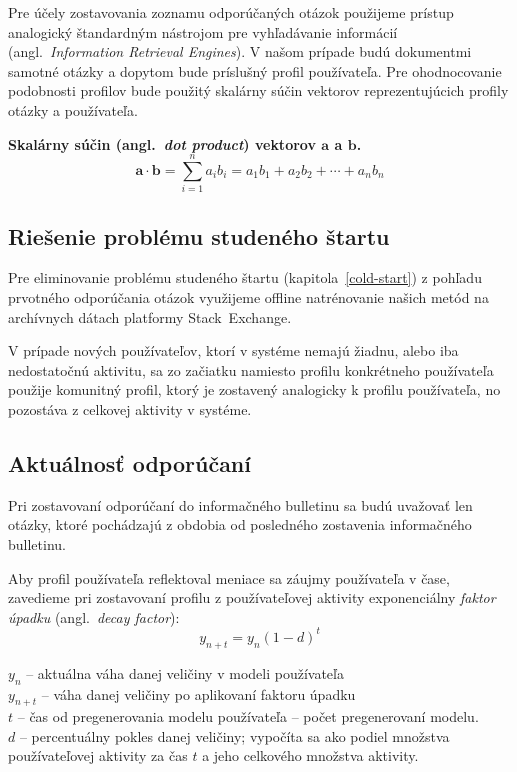 Pre účely zostavovania zoznamu odporúčaných otázok použijeme prístup analogický štandardným nástrojom pre vyhľadávanie
informácií (angl.~\emph{Information Retrieval Engines}). V našom prípade budú dokumentmi samotné otázky a dopytom bude
príslušný profil používateľa. Pre ohodnocovanie podobnosti profilov bude použitý skalárny súčin vektorov reprezentujúcich
profily otázky a používateľa.

\textbf{Skalárny súčin (angl.~\textit{dot product}) vektorov $\mathbf{a}$ a $\mathbf{b}$.}\\
$$\mathbf{a}\cdot\mathbf{b}=\sum_{i=1}^n a_ib_i=a_1b_1+a_2b_2+\cdots+a_nb_n$$

\subsection{Riešenie problému studeného štartu}

Pre eliminovanie problému studeného štartu (kapitola~\ref{cold-start}) z pohľadu prvotného odporúčania otázok využijeme
offline natrénovanie našich metód na archívnych dátach platformy Stack~Exchange.

V prípade nových používateľov, ktorí v systéme nemajú žiadnu, alebo iba nedostatočnú aktivitu, sa zo začiatku namiesto profilu
konkrétneho používateľa použije komunitný profil, ktorý je zostavený analogicky k profilu používateľa, no pozostáva
z celkovej aktivity v systéme.


\subsection{Aktuálnosť odporúčaní}
\label{design:freshness}
Pri zostavovaní odporúčaní do informačného bulletinu sa budú uvažovať len otázky, ktoré pochádzajú
z obdobia od posledného zostavenia informačného bulletinu.

Aby profil používateľa reflektoval meniace sa záujmy používateľa v čase, zavedieme pri zostavovaní profilu z používateľovej
aktivity exponenciálny \textit{faktor úpadku} (angl.~\textit{decay factor}):
$$y_{n+t} = y_n (1 - d)^t$$

\begin{adjustwidth}{1cm}{1cm}
$y_n$ -- aktuálna váha danej veličiny v modeli používateľa\\
$y_{n+t}$ -- váha danej veličiny po aplikovaní faktoru úpadku\\
$t$ -- čas od pregenerovania modelu používateľa -- počet pregenerovaní modelu.\\
$d$ -- percentuálny pokles danej veličiny; vypočíta sa ako podiel množstva používateľovej aktivity za čas $t$ a jeho celkového množstva aktivity.
\end{adjustwidth}

